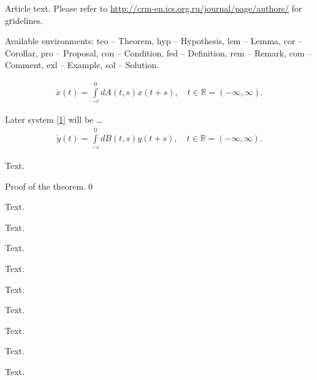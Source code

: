 \documentclass{crm-article}
\begin{document}
Article text. Please refer to \url{http://crm-en.ics.org.ru/journal/page/authors/} for gгidelines.


Available environments:
teo -- Theorem,
hyp -- Hypothesis,
lem -- Lemma,
cor -- Corollar,
pro -- Proposal,
con -- Condition,
fed -- Definition,
rem -- Remark,
com -- Comment,
exl -- Example,
sol -- Solution.


\begin{gather} \label{1}  %
\dot x(t)=\int\limits_{-r}^0 dA(t,s)x(t+s),\quad  t\in\mathbb R=(-\infty,\infty).
\end{gather}

Later system \eqref{1} will be \ldots
\begin{gather} \label{2}  %
\dot y(t)=\int\limits_{-r}^0 dB(t,s)y(t+s),\quad  t\in\mathbb R=(-\infty,\infty).
\end{gather}


\begin{teo}
Text.
\end{teo}

\proof* %
Proof of the theorem.\qed

\begin{teo*}
Text.
\end{teo*}

\begin{hyp}
Text.
\end{hyp}

\begin{lem}
Text.
\end{lem}

\begin{cor}
Text.
\end{cor}

\begin{pro}
Text.
\end{pro}

\begin{con}
Text.
\end{con}

\begin{fed}
Text.
\end{fed}

\begin{rem}
Text.
\end{rem}

\begin{com}
Text.
\end{com}
\end{document}
